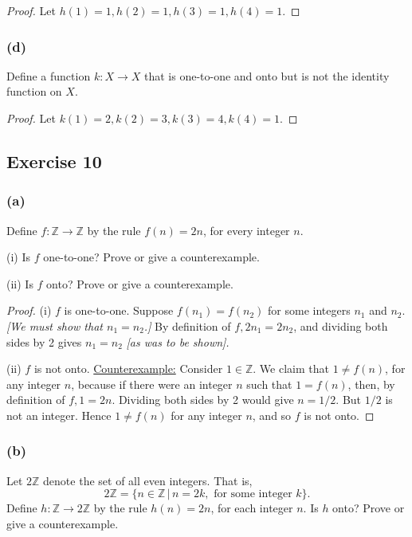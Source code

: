 \documentclass[14pt]{extarticle}
\newcommand{\Z}{\mathbb{Z}}
\begin{document}
\begin{proof}
Let \(h(1) = 1, h(2) = 1, h(3) = 1, h(4) = 1\).
\end{proof}

\subsubsection{(d)}
Define a function \(k: X \to X\) that is one-to-one and onto but is not the identity function on $X$.

\begin{proof}
Let \(k(1) = 2, k(2) = 3, k(3) = 4, k(4) = 1\).
\end{proof}

\subsection{Exercise 10}
\subsubsection{(a)}
Define \(f: \Z \to \Z\) by the rule \(f(n) = 2n\), for every integer $n$.

(i) Is $f$ one-to-one? Prove or give a counterexample.

(ii) Is $f$ onto? Prove or give a counterexample.

\begin{proof}
(i) $f$ is one-to-one. Suppose \(f(n_1) = f(n_2)\) for some integers $n_1$ and $n_2$. {\it [We must show that \(n_1 = 
n_2\).]} By definition of \(f, 2n_1 = 2n_2\), and dividing both sides by 2 gives $n_1 = n_2$ {\it [as was to be shown].}

(ii) $f$ is not onto. \underline{Counterexample:} Consider \(1 \in \Z\). We claim that \(1 \neq f(n)\), for any 
integer $n$, because if there were an integer $n$ such that \(1 = f(n)\), then, by definition of \(f, 1 = 2n\). 
Dividing both sides by 2 would give \(n = 1/2\). But $1/2$ is not an integer. Hence \(1 \neq f(n)\) for any integer 
$n$, and so $f$ is not onto.
\end{proof}

\subsubsection{(b)}
Let $2\Z$ denote the set of all even integers. That is, 
\[
2\Z = \{n \in \Z \,|\,n=2k, \text{ for some integer } k\}.
\]
Define \(h: \Z \to 2\Z\) by the rule \(h(n) = 2n\), for each integer $n$. Is $h$ onto? Prove or give a counterexample.
\end{document}
